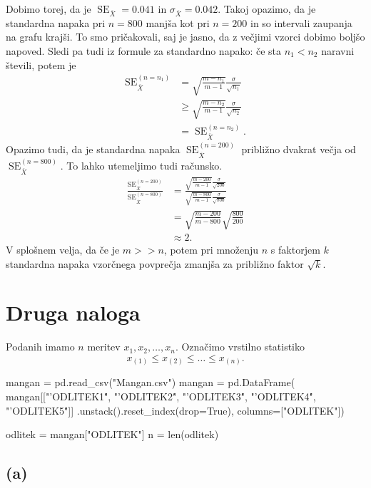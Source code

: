 \documentclass[10pt, a4paper]{article}
\DeclareMathOperator{\se}{SE}
\begin{document}
Dobimo torej, da je $\se_{\overline{X}} = 0.041$ in $\sigma_{\overline{X}} = 0.042$.
Takoj opazimo, da je standardna napaka pri $n = 800$ manjša kot pri $n = 200$ in so intervali zaupanja
na grafu krajši. To smo pričakovali,
saj je jasno, da z večjimi vzorci dobimo boljšo napoved. 
Sledi pa tudi iz formule za standardno napako: če sta $n_1 < n_2$ naravni števili, potem je 
\begin{align*}
    \se_{\overline{X}} ^{(n = n_1)} &= \sqrt{\frac{m - n_1}{m - 1}} \frac{\sigma}{\sqrt{n_1}}\\
    &\geq \sqrt{\frac{m - n_2}{m - 1}} \frac{\sigma}{\sqrt{n_2}}\\
    &= \se_{\overline{X}} ^{(n = n_2)}.
\end{align*}
Opazimo tudi, da je standardna napaka $\se_{\overline{X}} ^{(n = 200)}$ približno dvakrat večja od $\se_{\overline{X}} ^{(n = 800)}$.
To lahko utemeljimo tudi računsko.
\begin{align*}
    \frac{\se_{\overline{X}} ^{(n = 200)}}{\se_{\overline{X}} ^{(n = 800)}} &= \frac{\sqrt{\frac{m - 200}{m - 1}} \frac{\sigma}{\sqrt{200}}}{\sqrt{\frac{m - 800}{m - 1}} \frac{\sigma}{\sqrt{800}}}\\
    &= \sqrt{\frac{m - 200}{m - 800}} \sqrt{\frac{800}{200}}\\
    &\approx 2.
\end{align*}
V splošnem velja, da če je $m >> n$, potem pri množenju $n$ s faktorjem $k$ standardna napaka 
vzorčnega povprečja zmanjša za približno faktor $\sqrt{k}$.

\section*{Druga naloga}

Podanih imamo $n$ meritev $x_1, x_2, \dots, x_n$.
Označimo vrstilno statistiko 
$$x_{(1)} \leq x_{(2)} \leq \dots \leq x_{(n)}.$$

\begin{python}
    mangan = pd.read_csv("Mangan.csv")
    mangan = pd.DataFrame(
        mangan[["'ODLITEK1\'", "'ODLITEK2\'", 
        "'ODLITEK3\'", "'ODLITEK4\'", "'ODLITEK5\'"]]
            .unstack().reset_index(drop=True), 
            columns=["ODLITEK"])

    odlitek = mangan["ODLITEK"]
    n = len(odlitek)
\end{python}

\subsection*{(a)}
\end{document}
